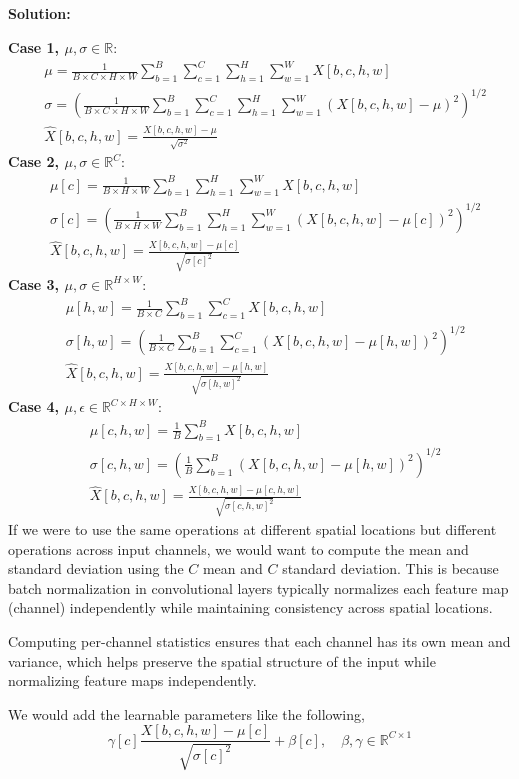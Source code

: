 \documentclass{article}
\newenvironment{solution}
  {\par\noindent\textbf{Solution:}\par}
  {\par}
\begin{document}
\subsection{}
\begin{solution}
\textbf{Case 1, $\mu,\sigma \in \mathbb{R}$}: 
  \[
  \begin{aligned}
&\mu = \frac{1}{B \times C \times H \times W}\sum_{b=1}^B\sum_{c=1}^C\sum_{h=1}^H\sum_{w=1}^W X[b,c,h,w] \\ 
&\sigma = \left( \frac{1}{B \times C \times H \times W}\sum_{b=1}^B\sum_{c=1}^C\sum_{h=1}^H\sum_{w=1}^W (X[b,c,h,w] - \mu)^2\right)^{1/2} \\ 
&\hat{X}[b,c,h,w] = \frac{X[b,c,h,w]- \mu}{\sqrt{ \sigma^2}}
\end{aligned}
  \]
  \textbf{Case 2, $\mu,\sigma \in \mathbb{R}^{C}$}:
  \[
\begin{aligned}
&\mu[c] = \frac{1}{B \times H \times W}\sum_{b=1}^B\sum_{h=1}^H\sum_{w=1}^W X[b,c,h,w] \\ 
&\sigma[c] = \left( \frac{1}{B \times H \times W}\sum_{b=1}^B\sum_{h=1}^H\sum_{w=1}^W (X[b,c,h,w] - \mu[c])^2\right)^{1/2} \\ 
&\hat{X}[b,c,h,w] = \frac{X[b,c,h,w]- \mu[c]}{\sqrt{ \sigma[c]^2 }}
\end{aligned}
\] 
\textbf{Case 3, $\mu,\sigma \in \mathbb{R}^{H\times W}$}:
\[
\begin{aligned}
&\mu[h,w] = \frac{1}{B \times C}\sum_{b=1}^B\sum_{c=1}^C X[b,c,h,w] \\ 
&\sigma[h,w] = \left( \frac{1}{B \times C}\sum_{b=1}^B\sum_{c=1}^C (X[b,c,h,w] - \mu[h,w])^2\right)^{1/2} \\ 
&\hat{X}[b,c,h,w] = \frac{X[b,c,h,w]- \mu[h,w]}{\sqrt{ \sigma[h,w]^2 }}
\end{aligned}
\]
\textbf{Case 4, $\mu, \epsilon \in \mathbb{R}^{C \times H \times W}$}:
\[
\begin{aligned}
&\mu[c,h,w] = \frac{1}{B }\sum_{b=1}^B X[b,c,h,w] \\ 
&\sigma[c,h,w] = \left( \frac{1}{B }\sum_{b=1}^B(X[b,c,h,w] - \mu[h,w])^2\right)^{1/2} \\ 
&\hat{X}[b,c,h,w] = \frac{X[b,c,h,w]- \mu[c,h,w]}{\sqrt{ \sigma[c,h,w]^2 }}
\end{aligned}
\]
If we were to use the same operations at different spatial locations but different operations across input channels, we would want to compute
the mean and standard deviation using the $C$ mean and $C$ standard deviation. This is because batch normalization in convolutional layers 
typically normalizes each feature map (channel) independently while maintaining consistency across spatial locations. 

Computing per-channel statistics ensures that each channel has its own mean and variance, which helps preserve the spatial structure of the input 
while normalizing feature maps independently.

We would add the learnable parameters like the following,
\[ 
  \gamma[c] \frac{X[b,c,h,w]- \mu[c]}{\sqrt{ \sigma[c]^2 }}+ \beta[c], \quad \beta,\gamma \in \mathbb{R}^{C \times 1}
\]
\end{solution}
\end{document}
